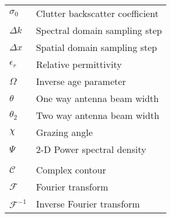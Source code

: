 \begin{supertabular}{ll}
$\sigma_0$ & Clutter backscatter coefficient \\
$\Delta k$ & Spectral domain sampling step \\
$\Delta x$ & Spatial domain sampling step \\
$\epsilon_r$ & Relative permittivity \\
$\Omega$ & Inverse age parameter \\
$\theta$ & One way antenna beam width \\
$\theta_2$ & Two way antenna beam width \\
$\chi$ & Grazing angle \\
$\Psi $ & 2-D Power spectral density \\
\\
$\mathcal{C}$ & Complex contour \\
$\mathcal{F}$ & Fourier transform \\
$\mathcal{F}^{-1}$ & Inverse Fourier transform \\
\end{supertabular}